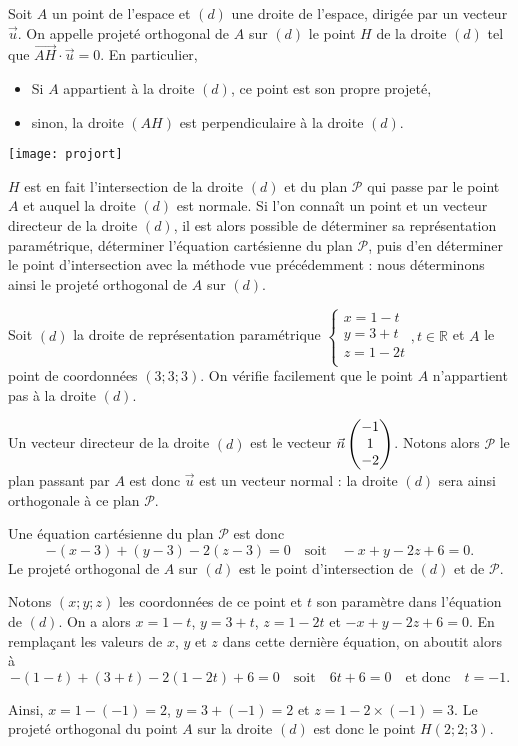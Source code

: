 \documentclass[11pt,fleqn, openany]{book} %
\begin{document}
\begin{definition}Soit $A$ un point de l'espace et $(d)$ une droite de l'espace, dirigée par un vecteur $\vec u$.
On appelle projeté orthogonal de $A$ sur $(d)$ le point $H$ de la droite $(d)$ tel que $\overrightarrow{AH} \cdot \vec{u}=0$. En particulier,
\begin{itemize}
\item Si $A$ appartient à la droite $(d)$, ce point est son propre projeté,
\item sinon, la droite $(AH)$ est perpendiculaire à la droite $(d)$.
\end{itemize}\end{definition}

\begin{center}
\texttt{[image: projort]}
\end{center}

$H$ est en fait l'intersection de la droite $(d)$ et du plan $\mathcal{P}$ qui passe par le point $A$ et auquel la droite $(d)$ est normale. Si l'on connaît un point et un vecteur directeur de la droite $(d)$, il est alors possible de déterminer sa représentation paramétrique, déterminer l'équation cartésienne du plan $\mathcal{P}$, puis d'en déterminer le point d'intersection avec la méthode vue précédemment : nous déterminons ainsi le projeté orthogonal de $A$ sur $(d)$.

\begin{example}Soit $(d)$ la droite de représentation paramétrique  $\left\{ \begin{array}{l}x=1-t \\ y=3+t \\ z = 1-2t \\\end{array}\right., t \in \mathbb{R}$ et $A$ le point de coordonnées $(3;3;3)$. On vérifie facilement que le point $A$ n'appartient pas à la droite $(d)$.

Un vecteur directeur de la droite $(d)$ est le vecteur $\vec n\renewcommand{\arraystretch}{1}\begin{pmatrix}-1\\1\\-2\end{pmatrix}$. Notons alors $\mathcal{P}$ le plan passant par $A$ est donc $\vec u$ est un vecteur normal : la droite $(d)$ sera ainsi orthogonale à ce plan $\mathcal{P}$. 

Une équation cartésienne du plan $\mathcal{P}$ est donc \[-(x-3)+(y-3)-2(z-3)=0\quad\text{soit}\quad -x+y-2z+6=0.\] Le projeté orthogonal de $A$ sur $(d)$ est le point d'intersection de $(d)$ et de $\mathcal{P}$.

Notons $(x;y;z)$ les coordonnées de ce point et $t$ son paramètre dans l'équation de $(d)$. On a alors $x=1-t$, $y=3+t$, $z=1-2t$ et $-x+y-2z+6=0$. En remplaçant les valeurs de $x$, $y$ et $z$ dans cette dernière équation, on aboutit alors à \[-(1-t)+(3+t)-2(1-2t)+6=0\quad \text{soit}\quad 6t+6=0 \quad \text{et donc}\quad t=-1.\]

Ainsi, $x=1-(-1)=2$, $y=3+(-1)=2$ et $z=1-2\times(-1)=3$. Le projeté orthogonal du point $A$ sur la droite $(d)$ est donc le point $H(2;2;3)$.\end{example}
\end{document}
